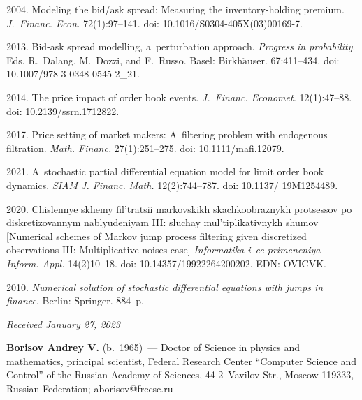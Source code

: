 \begin{multicols}{2}
{{\begin{thebibliography}{99}
 2004.
Modeling the bid/ask spread: Measuring the inventory-holding premium.
\textit{J.~Financ. Econ.} 72(1):97--141. doi: 10.1016/S0304-405X(03)00169-7.

 2013. Bid-ask spread modelling, a~perturbation approach. 
\textit{Progress in probability}. 
Eds. R.~Dalang, M.~Dozzi, and F.~Russo. Basel: Birkh$\ddot{\mbox{a}}$user. 67:411--434. doi: 10.1007/978-3-0348-0545-2\_21.

 2014. The price impact of order book events. \textit{J.~Financ. Economet.} 12(1):47--88. 
doi: 10.2139/ssrn.1712822.

 
 2017. Price setting of market makers: A~filtering problem with endogenous filtration. 
\textit{Math. Financ.} 27(1):251--275. 
doi: 10.1111/mafi.12079.

 2021. A~stochastic partial differential equation model for limit order book dynamics. 
\textit{SIAM J. Financ. Math.} 12(2):744--787. doi: 10.1137/ 19M1254489.
 
 2020. Chislennye skhemy fil'tratsii markovskikh skachkoobraznykh protsessov po diskretizovannym nablyudeniyam III:
 sluchay mul'tiplikativnykh shumov [Numerical schemes of Markov jump process filtering given discretized observations III: Multiplicative noises case]
\textit{Informatika i~ee primeneniya~--- Inform. Appl.} 14(2)10--18. doi: 10.14357/19922264200202. EDN: OVICVK.

 2010. 
\textit{Numerical solution of stochastic differential equations with jumps in finance}. Berlin: Springer. 884~p.

\end{thebibliography}

 }
 }

\end{multicols}

\vspace*{-6pt}

\hfill{\small\textit{Received January 27, 2023}} 

\vspace*{-12pt}

\Contrl

\vspace*{-4pt}

\noindent
\textbf{Borisov Andrey V.} (b.\ 1965)~--- 
Doctor of Science in physics and mathematics, principal scientist, Federal Research Center ``Computer Science and Control'' 
of the Russian Academy of Sciences, 44-2~Vavilov Str., Moscow 119333, Russian Federation; \mbox{aborisov@frccsc.ru}






\label{end\stat}

\renewcommand{\bibname}{\protect\rm Литература} 